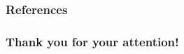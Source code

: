 \documentclass{beamer}
\begin{document}
\begin{frame}[t, allowframebreaks]
\frametitle{References}
\printbibliography
\end{frame}


\begin{frame}[c]
\begin{center}
\frametitle{\LARGE Thank you for your attention!}   

{\LARGE \inserttitle}

{\insertsubtitle}

\bigskip

{\insertauthor} 

\bigskip\bigskip

{\insertinstitute}

\bigskip\bigskip

{\large \insertdate}
\end{center}
\end{frame}
\end{document}
